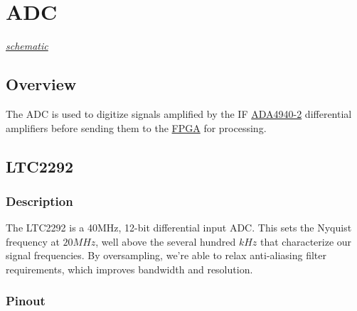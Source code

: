 \section{ADC}
\label{sec:adc}
\textit{\hyperlink{schematic.4}{schematic}}

\subsection{Overview}
\label{sec:adc-overview}

The ADC is used to digitize signals amplified by the IF \hyperref[sec:ada4940-2]{ADA4940-2}
differential amplifiers before sending them to the \hyperref[sec:xc7a15t-ftg256]{FPGA} for
processing.

\subsection{LTC2292}
\label{sec:ltc2292}

\subsubsection{Description}
\label{sec:ltc2292-description}

The LTC2292 is a 40MHz, 12-bit differential input ADC\@. This sets the Nyquist frequency at
$20 \si{MHz}$, well above the several hundred $\si{kHz}$ that characterize our signal
frequencies. By oversampling, we're able to relax anti-aliasing filter requirements, which improves
bandwidth and resolution.

\subsubsection{Pinout}
\label{sec:ltc2292-pinout}


